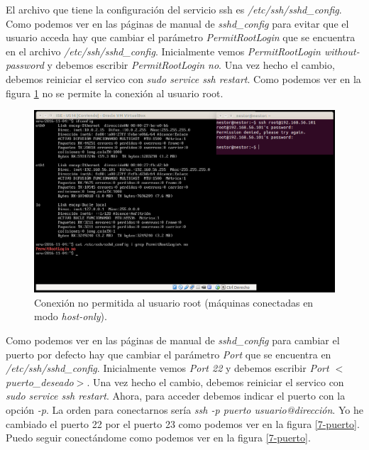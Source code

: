 \documentclass[a4paper,titlepage,12pt]{scrartcl}	%
\numberwithin{figure}{section} %
\numberwithin{table}{section} %
\begin{document}
	El archivo que tiene la configuración del servicio ssh es \textit{/etc/ssh/sshd\_config}. \cite{opensshconfigman} \\
	
	Como podemos ver en las páginas de manual de \textit{sshd\_config} \cite{opensshconfigman} para evitar que el usuario acceda hay que cambiar el parámetro \textit{PermitRootLogin} que se encuentra en el archivo \textit{/etc/ssh/sshd\_config}. Inicialmente vemos \textit{PermitRootLogin without-password} y debemos escribir  \textit{PermitRootLogin no}. Una vez hecho el cambio, debemos reiniciar el servico con \textit{sudo service ssh restart}. Como podemos ver en la figura \ref{7-noroot} no se permite la conexión al usuario root.
	\begin{figure}[H]
		\includegraphics[width=\linewidth]{./Imagenes/7-noroot.png}
		\vspace{-0.5cm}
		\caption[Conexión no permitida al usuario root (máquinas conectadas en modo \textit{host-only}).]{Conexión no permitida al usuario root (máquinas conectadas en modo \textit{host-only}).}
		\label{7-noroot}
	\end{figure}
	
	Como podemos ver en las páginas de manual de \textit{sshd\_config} \cite{opensshconfigman} para cambiar el puerto por defecto hay que cambiar el parámetro \textit{Port} que se encuentra en \textit{/etc/ssh/sshd\_config}. Inicialmente vemos \textit{Port 22} y debemos escribir  \textit{Port $<$puerto\_deseado$>$}. Una vez hecho el cambio, debemos reiniciar el servico con \textit{sudo service ssh restart}. Ahora, para acceder debemos indicar el puerto con la opción \textit{-p}. La orden para conectarnos sería \textit{ssh -p puerto usuario@dirección}. Yo he cambiado el puerto 22 por el puerto 23 como podemos ver en la figura \ref{7-puerto}. Puedo seguir conectándome como podemos ver en la figura \ref{7-puerto}.
	
\end{document}
